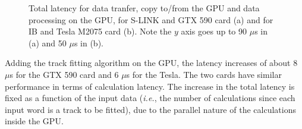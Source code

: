 \documentclass[journal]{IEEEtran}
\begin{document}
\begin{figure}[!t]
  \centering
\hspace{1mm}
\caption{Total latency for data tranfer, copy to/from the GPU and data 
processing on the GPU, for S-LINK and GTX 590 card (a) and for IB and Tesla M2075 card (b). Note the $y$ axis goes up to 90 $\mu$s in (a) and 50 $\mu$s in (b).} 
\end{figure}


% 
Adding the track fitting algorithm on the GPU, the latency increases of
about 8~$\mu$s for the GTX 590 card and 6 $\mu$s for the Tesla. 
The two cards have similar performance in terms of calculation latency. 
The increase in the total latency is fixed as a function of 
the input data (\textit{i.e.}, the number of calculations since each input 
word is a track to be fitted), due to the parallel nature of the 
calculations inside the GPU.
\end{document}
